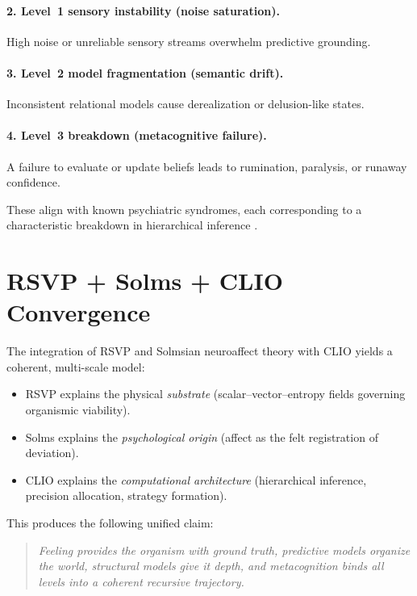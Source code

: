 \documentclass[12pt,oneside]{book}
\theoremstyle{plain}
\theoremstyle{definition}
\let\citep\parencite
\begin{document}
\paragraph{2. Level~1 sensory instability (noise saturation).}
High noise or unreliable sensory streams overwhelm predictive grounding.

\paragraph{3. Level~2 model fragmentation (semantic drift).}
Inconsistent relational models cause derealization or delusion-like states.

\paragraph{4. Level~3 breakdown (metacognitive failure).}
A failure to evaluate or update beliefs leads to rumination, paralysis,
or runaway confidence.

These align with known psychiatric syndromes, each corresponding to a
characteristic breakdown in hierarchical inference
\citep{montague2012computational,corlett2016prediction}.

\section{RSVP + Solms + CLIO Convergence}

The integration of RSVP and Solmsian neuroaffect theory with CLIO yields a
coherent, multi-scale model:

\begin{itemize}
  \item RSVP explains the physical \emph{substrate}
  (scalar–vector–entropy fields governing organismic viability).

  \item Solms explains the \emph{psychological origin}
  (affect as the felt registration of deviation).

  \item CLIO explains the \emph{computational architecture}
  (hierarchical inference, precision allocation, strategy formation).
\end{itemize}

This produces the following unified claim:

\begin{quote}
\emph{Feeling provides the organism with ground truth,
predictive models organize the world,
structural models give it depth,
and metacognition binds all levels into a coherent recursive trajectory.}
\end{quote}
\end{document}
